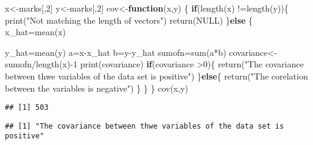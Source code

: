 \documentclass[
]{article}
\newenvironment{Shaded}{\begin{snugshade}}{\end{snugshade}}
\newcommand{\ConstantTok}[1]{\textcolor[rgb]{0.00,0.00,0.00}{#1}}
\newcommand{\ControlFlowTok}[1]{\textcolor[rgb]{0.13,0.29,0.53}{\textbf{#1}}}
\newcommand{\DecValTok}[1]{\textcolor[rgb]{0.00,0.00,0.81}{#1}}
\newcommand{\FunctionTok}[1]{\textcolor[rgb]{0.00,0.00,0.00}{#1}}
\newcommand{\NormalTok}[1]{#1}
\newcommand{\OtherTok}[1]{\textcolor[rgb]{0.56,0.35,0.01}{#1}}
\newcommand{\SpecialCharTok}[1]{\textcolor[rgb]{0.00,0.00,0.00}{#1}}
\newcommand{\StringTok}[1]{\textcolor[rgb]{0.31,0.60,0.02}{#1}}
\begin{document}
\begin{Shaded}
\begin{Highlighting}[]
\NormalTok{x}\OtherTok{\textless{}{-}}\NormalTok{marks[,}\DecValTok{2}\NormalTok{]}
\NormalTok{y}\OtherTok{\textless{}{-}}\NormalTok{marks[,}\DecValTok{2}\NormalTok{]}
\NormalTok{cov}\OtherTok{\textless{}{-}}\ControlFlowTok{function}\NormalTok{(x,y) \{}
  \ControlFlowTok{if}\NormalTok{(}\FunctionTok{length}\NormalTok{(x) }\SpecialCharTok{!=}\FunctionTok{length}\NormalTok{(y))\{}
    \FunctionTok{print}\NormalTok{(}\StringTok{"Not matching the length of vectors"}\NormalTok{)}
    \FunctionTok{return}\NormalTok{(}\ConstantTok{NULL}\NormalTok{)}
\NormalTok{  \}}\ControlFlowTok{else}\NormalTok{ \{}
\NormalTok{    x\_hat}\OtherTok{=}\FunctionTok{mean}\NormalTok{(x)}
    
\NormalTok{    y\_hat}\OtherTok{=}\FunctionTok{mean}\NormalTok{(y)}
\NormalTok{    a}\OtherTok{=}\NormalTok{x}\SpecialCharTok{{-}}\NormalTok{x\_hat}
\NormalTok{    b}\OtherTok{=}\NormalTok{y}\SpecialCharTok{{-}}\NormalTok{y\_hat}
\NormalTok{    sumofn}\OtherTok{=}\FunctionTok{sum}\NormalTok{(a}\SpecialCharTok{*}\NormalTok{b)}
\NormalTok{    covariance}\OtherTok{\textless{}{-}}\NormalTok{sumofn}\SpecialCharTok{/}\FunctionTok{length}\NormalTok{(x)}\SpecialCharTok{{-}}\DecValTok{1}
    \FunctionTok{print}\NormalTok{(covariance)}
    \ControlFlowTok{if}\NormalTok{(covariance }\SpecialCharTok{\textgreater{}}\DecValTok{0}\NormalTok{)\{}
      \FunctionTok{return}\NormalTok{(}\StringTok{"The covariance between thwe variables of the data set is positive"}\NormalTok{)}
\NormalTok{    \}}\ControlFlowTok{else}\NormalTok{\{}
      \FunctionTok{return}\NormalTok{(}\StringTok{"The corelation between the variables is negative"}\NormalTok{)}
\NormalTok{    \}}
\NormalTok{  \}}
\NormalTok{\}}
\FunctionTok{cov}\NormalTok{(x,y)}
\end{Highlighting}
\end{Shaded}

\begin{verbatim}
## [1] 503
\end{verbatim}

\begin{verbatim}
## [1] "The covariance between thwe variables of the data set is positive"
\end{verbatim}
\end{document}
